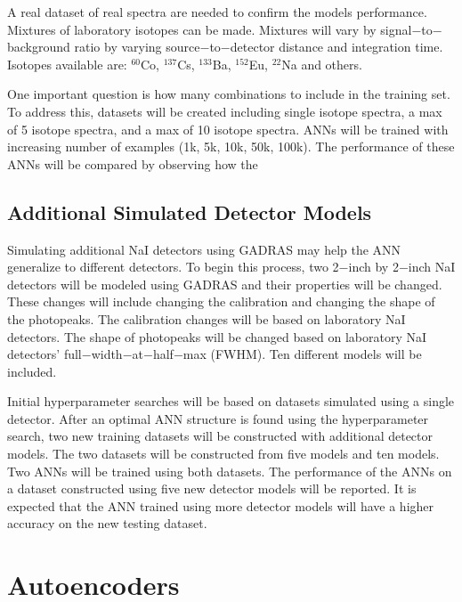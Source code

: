 \documentclass[tocnosub,noragright,centerchapter,12pt,fullpage]{uiucecethesis09}
\begin{document}
A real dataset of real spectra are needed to confirm the models performance. Mixtures of laboratory isotopes can be made. Mixtures will vary by signal$-$to$-$background ratio by varying source$-$to$-$detector distance and integration time. Isotopes available are: $^{60}$Co, $^{137}$Cs, $^{133}$Ba, $^{152}$Eu, $^{22}$Na and others. %

One important question is how many combinations to include in the training set. To address this, datasets will be created including single isotope spectra, a max of 5 isotope spectra, and a max of 10 isotope spectra. ANNs will be trained with increasing number of examples (1k, 5k, 10k, 50k, 100k). The performance of these ANNs will be compared by observing how the 

\subsection{Additional Simulated Detector Models}

Simulating additional NaI detectors using GADRAS may help the ANN generalize to different detectors. To begin this process, two 2$-$inch by 2$-$inch NaI detectors will be modeled using GADRAS and their properties will be changed. These changes will include changing the calibration and changing the shape of the photopeaks. The calibration changes will be based on laboratory NaI detectors. The shape of photopeaks will be changed based on laboratory NaI detectors' full$-$width$-$at$-$half$-$max (FWHM). Ten different models will be included. 

Initial hyperparameter searches will be based on datasets simulated using a single detector. After an optimal ANN structure is found using the hyperparameter search, two new training datasets will be constructed with additional detector models. The two datasets will be constructed from five models and ten models. Two ANNs will be trained using both datasets. The performance of the ANNs on a dataset constructed using five new detector models will be reported. It is expected that the ANN trained using more detector models will have a higher accuracy on the new testing dataset. 


\section{Autoencoders} \label{Autoencoders}

\end{document}
